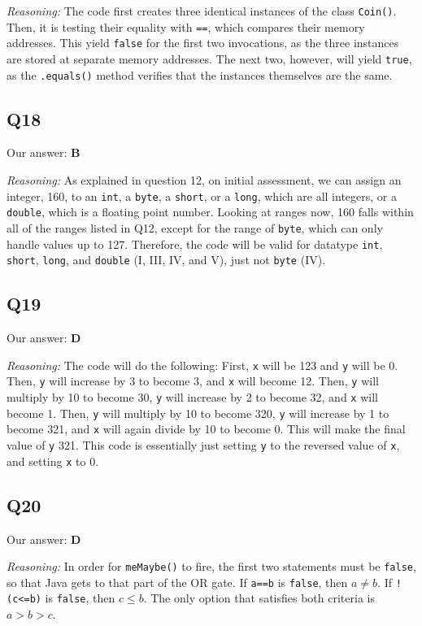 \documentclass{article}
\begin{document}
\noindent\textit{Reasoning:} The code first creates three identical instances of the class \verb|Coin()|. Then, it is testing their equality with \verb|==|, which compares their memory addresses. This yield \verb|false| for the first two invocations, as the three instances are stored at separate memory addresses. The next two, however, will yield \verb|true|, as the \verb|.equals()| method verifies that the instances themselves are the same.

\subsection{Q18}

Our answer: \textbf{B}

\noindent\textit{Reasoning:} As explained in question 12, on initial assessment, we can assign an integer, 160, to an \verb|int|, a \verb|byte|, a \verb|short|, or a \verb|long|, which are all integers, or a \verb|double|, which is a floating point number. Looking at ranges now, 160 falls within all of the ranges listed in Q12, except for the range of \verb|byte|, which can only handle values up to 127. Therefore, the code will be valid for datatype \verb|int|, \verb|short|, \verb|long|, and \verb|double| (I, III, IV, and V), just not \verb|byte| (IV).

\subsection{Q19}

Our answer: \textbf{D}

\noindent\textit{Reasoning:} The code will do the following:
First, \verb|x| will be 123 and \verb|y| will be 0. Then, \verb|y| will increase by 3 to become 3, and \verb|x| will become 12. Then, \verb|y| will multiply by 10 to become 30, \verb|y| will increase by 2 to become 32, and \verb|x| will become 1. Then, \verb|y| will multiply by 10 to become 320, \verb|y| will increase by 1 to become 321, and \verb|x| will again divide by 10 to become 0. This will make the final value of \verb|y| 321. This code is essentially just setting \verb|y| to the reversed value of \verb|x|, and setting \verb|x| to 0.

\subsection{Q20}

Our answer: \textbf{D}

\noindent\textit{Reasoning:} In order for \verb|meMaybe()| to fire, the first two statements must be \verb|false|, so that Java gets to that part of the OR gate. If \verb|a==b| is \verb|false|, then \(a \neq b\). If \verb|!(c<=b)| is \verb|false|, then \(c \leq b\). The only option that satisfies both criteria is \(a > b > c\).
\end{document}
